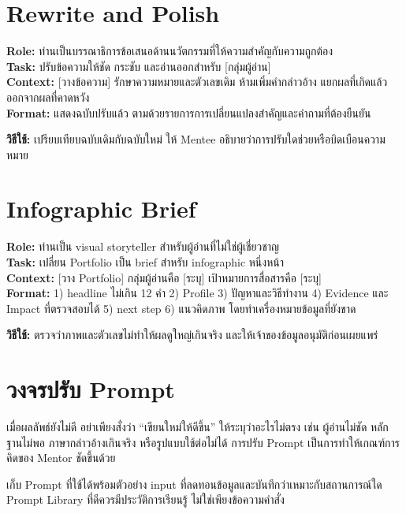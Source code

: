 \section{Rewrite and Polish}
\begin{promptbox}
\textbf{Role:} ท่านเป็นบรรณาธิการข้อเสนอด้านนวัตกรรมที่ให้ความสำคัญกับความถูกต้อง\\
\textbf{Task:} ปรับข้อความให้ชัด กระชับ และอ่านออกสำหรับ [กลุ่มผู้อ่าน]\\
\textbf{Context:} [วางข้อความ] รักษาความหมายและตัวเลขเดิม ห้ามเพิ่มคำกล่าวอ้าง แยกผลที่เกิดแล้วออกจากผลที่คาดหวัง\\
\textbf{Format:} แสดงฉบับปรับแล้ว ตามด้วยรายการการเปลี่ยนแปลงสำคัญและคำถามที่ต้องยืนยัน
\end{promptbox}
\textbf{วิธีใช้:} เปรียบเทียบฉบับเดิมกับฉบับใหม่ ให้ Mentee อธิบายว่าการปรับใดช่วยหรือบิดเบือนความหมาย

\section{Infographic Brief}
\begin{promptbox}
\textbf{Role:} ท่านเป็น visual storyteller สำหรับผู้อ่านที่ไม่ใช่ผู้เชี่ยวชาญ\\
\textbf{Task:} เปลี่ยน Portfolio เป็น brief สำหรับ infographic หนึ่งหน้า\\
\textbf{Context:} [วาง Portfolio] กลุ่มผู้อ่านคือ [ระบุ] เป้าหมายการสื่อสารคือ [ระบุ]\\
\textbf{Format:} 1) headline ไม่เกิน 12 คำ 2) Profile 3) ปัญหาและวิธีทำงาน 4) Evidence และ Impact ที่ตรวจสอบได้ 5) next step 6) แนวคิดภาพ โดยทำเครื่องหมายข้อมูลที่ยังขาด
\end{promptbox}
\textbf{วิธีใช้:} ตรวจว่าภาพและตัวเลขไม่ทำให้ผลดูใหญ่เกินจริง และให้เจ้าของข้อมูลอนุมัติก่อนเผยแพร่

\section{วงจรปรับ Prompt}
เมื่อผลลัพธ์ยังไม่ดี อย่าเพียงสั่งว่า \enquote{เขียนใหม่ให้ดีขึ้น} ให้ระบุว่าอะไรไม่ตรง เช่น ผู้อ่านไม่ชัด หลักฐานไม่พอ ภาษากล่าวอ้างเกินจริง หรือรูปแบบใช้ต่อไม่ได้ การปรับ Prompt เป็นการทำให้เกณฑ์การคิดของ Mentor ชัดขึ้นด้วย

\begin{mentornote}
เก็บ Prompt ที่ใช้ได้พร้อมตัวอย่าง input ที่ลดทอนข้อมูลและบันทึกว่าเหมาะกับสถานการณ์ใด Prompt Library ที่ดีควรมีประวัติการเรียนรู้ ไม่ใช่เพียงข้อความคำสั่ง
\end{mentornote}

